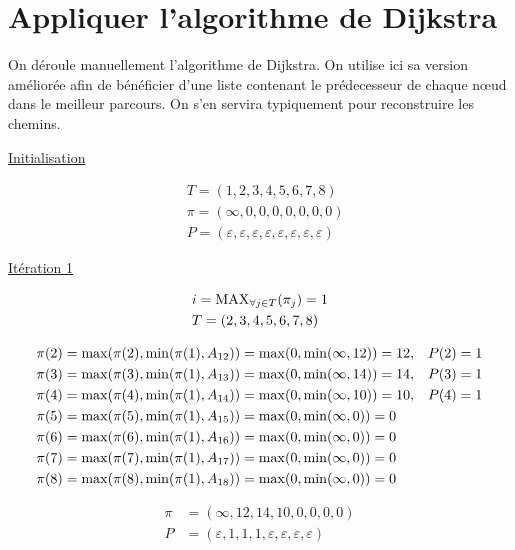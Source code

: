 \documentclass{article}
\begin{document}
\section{Appliquer l'algorithme de Dijkstra }

On déroule manuellement l'algorithme de Dijkstra. On utilise ici sa
version améliorée afin de bénéficier d'une liste contenant le
prédecesseur de chaque n\oe ud dans le meilleur parcours. On s'en
servira typiquement pour reconstruire les chemins.

\newpage

\underline{Initialisation}

\begin{align*}
  &T = (1,2,3,4,5,6,7,8) \\
  &\pi = (\infty, 0,0,0,0,0,0,0) \\
  &P = (\varepsilon,\varepsilon,\varepsilon,\varepsilon,\varepsilon,\varepsilon,\varepsilon,\varepsilon)
\end{align*}

\underline{Itération 1}

\begin{align*}
  &i = \operatorname{MAX}_{\forall j \in T}(\pi_j) = 1\\
  &T = (2,3,4,5,6,7,8)
\end{align*}

\begin{align*}
  &\pi(2) = \operatorname{max}(\pi(2), \operatorname{min}(\pi(1), A_{12})) = \operatorname{max}(0, \operatorname{min}(\infty,12)) = 12, &P(2) = 1\\
  &\pi(3) = \operatorname{max}(\pi(3), \operatorname{min}(\pi(1), A_{13})) = \operatorname{max}(0, \operatorname{min}(\infty,14)) = 14, &P(3) = 1\\
  &\pi(4) = \operatorname{max}(\pi(4), \operatorname{min}(\pi(1), A_{14})) = \operatorname{max}(0, \operatorname{min}(\infty,10)) = 10, &P(4) = 1\\
  &\pi(5) = \operatorname{max}(\pi(5), \operatorname{min}(\pi(1), A_{15})) = \operatorname{max}(0, \operatorname{min}(\infty,0)) = 0\\
  &\pi(6) = \operatorname{max}(\pi(6), \operatorname{min}(\pi(1), A_{16})) = \operatorname{max}(0, \operatorname{min}(\infty,0)) = 0\\
  &\pi(7) = \operatorname{max}(\pi(7), \operatorname{min}(\pi(1), A_{17})) = \operatorname{max}(0, \operatorname{min}(\infty,0)) = 0\\
  &\pi(8) = \operatorname{max}(\pi(8), \operatorname{min}(\pi(1), A_{18})) = \operatorname{max}(0, \operatorname{min}(\infty,0)) = 0
\end{align*}

\begin{align*}
  \pi &= (\infty,12,14,10,0,0,0,0)\\
  P &= (\varepsilon, 1, 1, 1, \varepsilon, \varepsilon, \varepsilon, \varepsilon)
\end{align*}
\end{document}

